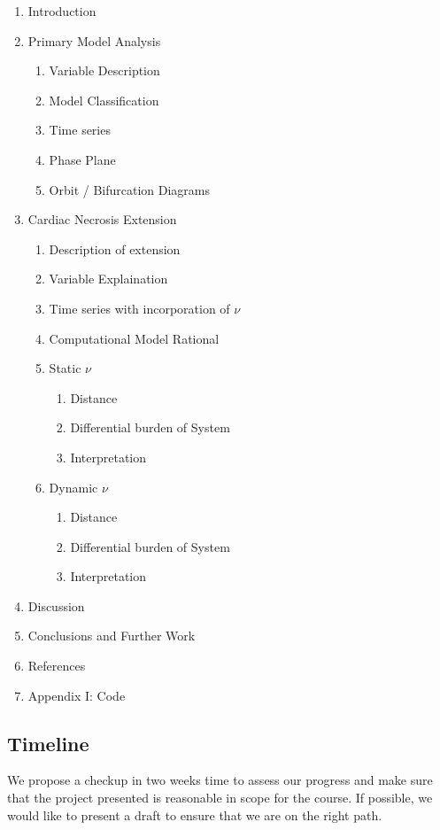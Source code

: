 \documentclass[11pt]{article}
\begin{document}
\begin{enumerate}
	\item Introduction
	\item Primary Model Analysis
	\begin{enumerate}
		\item Variable Description
		\item Model Classification
		\item Time series 
		\item Phase Plane
		\item Orbit / Bifurcation Diagrams
	\end{enumerate}
	\item Cardiac Necrosis Extension
	\begin{enumerate}
		\item Description of extension
		\item Variable Explaination
		\item Time series with incorporation of $\nu$
		\item Computational Model Rational
		\item Static $\nu$
		\begin{enumerate}
			\item Distance
			\item Differential burden of System 
			\item Interpretation
		\end{enumerate}
		\item Dynamic $\nu$
		\begin{enumerate}
			\item Distance
			\item Differential burden of System 
			\item Interpretation
		\end{enumerate}
	\end{enumerate}
	\item Discussion
	\item Conclusions and Further Work
	\item References
	\item Appendix I: Code 
\end{enumerate}


\subsection{Timeline} %
\label{sub:timeline}

We propose a checkup in two weeks time to assess our progress and make sure that the project presented is reasonable in scope for the course. If possible, we would like to present a draft to ensure that we are on the right path. 
\end{document}
